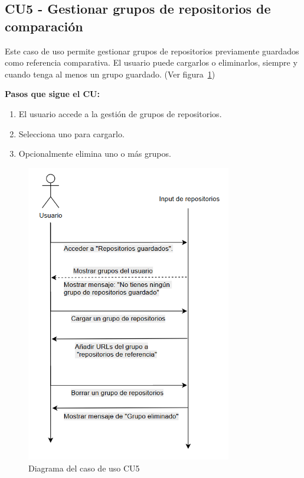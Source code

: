 \subsection*{CU5 - Gestionar grupos de repositorios de comparación}

Este caso de uso permite gestionar grupos de repositorios previamente guardados como referencia comparativa. El usuario puede cargarlos o eliminarlos, siempre y cuando tenga al menos un grupo guardado. (Ver figura~\ref{fig:DiagramaCU5})

\textbf{Pasos que sigue el CU:}
\begin{enumerate}
  \item El usuario accede a la gestión de grupos de repositorios.
  \item Selecciona uno para cargarlo.
  \item Opcionalmente elimina uno o más grupos.
\end{enumerate}

\begin{figure}[H]
\centering
\includegraphics[width=0.8\textwidth]{img/DiagramaCU5.png}
\caption{Diagrama del caso de uso CU5}
\label{fig:DiagramaCU5}
\end{figure}

